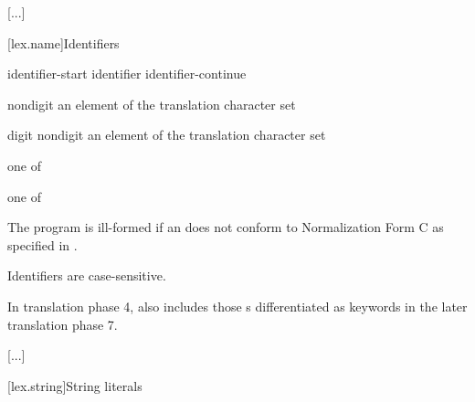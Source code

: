 \documentclass{wg21}
\begin{document}
\textcolor{noteclr}{[...]}

[lex.name]{Identifiers}

%
\begin{bnf}
    \br
    identifier-start\br
    identifier identifier-continue
\end{bnf}

\begin{bnf}
    \br
    nondigit\br
    \textnormal{an element of the translation character set }
\end{bnf}

\begin{bnf}
    \br
    digit\br
    nondigit\br
    \textnormal{an element of the translation character set }
\end{bnf}

\begin{bnf}
     \textnormal{one of}\br
    \br
    \br
    \br
\end{bnf}

\begin{bnf}
     \textnormal{one of}\br
\end{bnf}

\pnum
{}%
%
The program is ill-formed
if an  does not conform to
Normalization Form C as specified in .
\begin{note}
    Identifiers are case-sensitive.
\end{note}
\begin{note}
    In translation phase 4,
     also includes
    those s
    differentiated as keywords
    in the later translation phase 7.
\end{note}

\textcolor{noteclr}{[...]}

[lex.string]{String literals}
\end{document}
